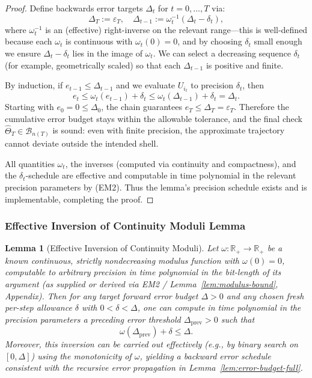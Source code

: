 \documentclass[12pt]{article}
\theoremstyle{definition}
\theoremstyle{plain}
\newtheorem{lemma}{Lemma}[section]
\begin{document}
\begin{proof}
Define backwards error targets \(\Delta_t\) for \(t=0,\dots,T\) via:
\[
\Delta_T := \varepsilon_T,\quad 
\Delta_{t-1} := \omega_t^{-1}(\Delta_t - \delta_t),
\]
where \(\omega_t^{-1}\) is an (effective) right-inverse on the relevant range—this is well-defined because each \(\omega_t\) is continuous with \(\omega_t(0)=0\), and by choosing \(\delta_t\) small enough we ensure \(\Delta_t - \delta_t\) lies in the image of \(\omega_t\). We can select a decreasing sequence \(\delta_t\) (for example, geometrically scaled) so that each \(\Delta_{t-1}\) is positive and finite.

By induction, if \(e_{t-1} \le \Delta_{t-1}\) and we evaluate \(U_{i_t}\) to precision \(\delta_t\), then
\[
e_t \le \omega_t(e_{t-1}) + \delta_t \le \omega_t(\Delta_{t-1}) + \delta_t = \Delta_t.
\]
Starting with \(e_0=0\le \Delta_0\), the chain guarantees \(e_T\le \Delta_T=\varepsilon_T\). Therefore the cumulative error budget stays within the allowable tolerance, and the final check \(\widehat\Theta_T\in\mathcal B_{n(T)}\) is sound: even with finite precision, the approximate trajectory cannot deviate outside the intended shell.

All quantities \(\omega_t\), the inverses (computed via continuity and compactness), and the \(\delta_t\)-schedule are effective and computable in time polynomial in the relevant precision parameters by (EM2). Thus the lemma’s precision schedule exists and is implementable, completing the proof.
\end{proof}

\subsubsection{Effective Inversion of Continuity Moduli Lemma}
\begin{lemma}[Effective Inversion of Continuity Moduli]
\label{lem:moduli-inversion}
Let \(\omega:\mathbb R_+\to\mathbb R_+\) be a known continuous, strictly nondecreasing modulus function with \(\omega(0)=0\), computable to arbitrary precision in time polynomial in the bit-length of its argument (as supplied or derived via EM2 / Lemma~\ref{lem:modulus-bound}, Appendix). Then for any target forward error budget \(\Delta>0\) and any chosen fresh per-step allowance \(\delta\) with \(0<\delta<\Delta\), one can compute in time polynomial in the precision parameters a preceding error threshold \(\Delta_{\mathrm{prev}}>0\) such that
\[
\omega(\Delta_{\mathrm{prev}}) + \delta \le \Delta.
\]
Moreover, this inversion can be carried out effectively (e.g., by binary search on \([0,\Delta]\)) using the monotonicity of \(\omega\), yielding a backward error schedule consistent with the recursive error propagation in Lemma~\ref{lem:error-budget-full}.
\end{lemma}
\end{document}
